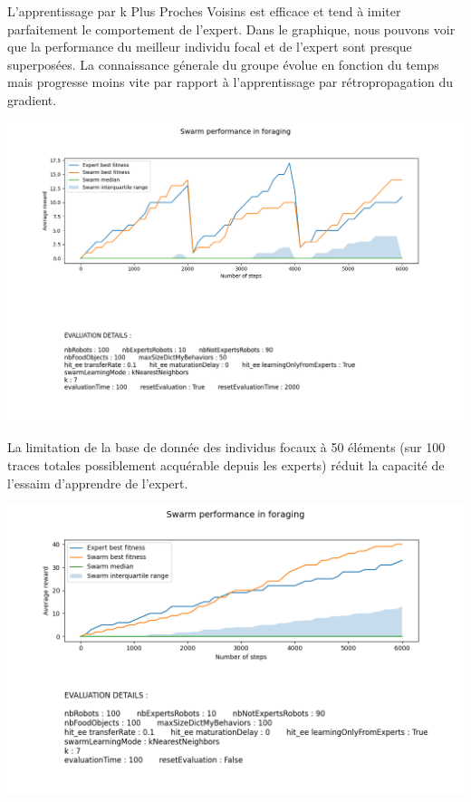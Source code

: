 \documentclass[a4paper, 12pt]{report}
\begin{document}
    L'apprentissage par k Plus Proches Voisins est efficace et tend à imiter parfaitement le comportement de l'expert.
    Dans le graphique, nous pouvons voir que la performance du meilleur individu focal et de l'expert sont presque superposées. La connaissance génerale du groupe évolue en fonction du temps mais progresse moins vite par rapport à l'apprentissage par rétropropagation du gradient.
    
    \includegraphics[scale=0.5]{Compte_Rendu/images/knn6000_50.png}
    
    La limitation de la base de donnée des individus focaux à 50 éléments (sur 100 traces totales possiblement acquérable depuis les experts) réduit la capacité de l'essaim d'apprendre de l'expert. 
    
    
    \includegraphics[scale=0.5]{Compte_Rendu/images/knn6000_100_noReset.png}
        
\end{document}
